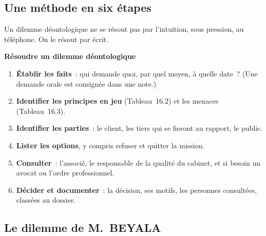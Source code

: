 \subsection{Une méthode en six étapes}

Un dilemme déontologique ne se résout pas par l'intuition, sous pression,
au téléphone. On le résout par écrit.

\begin{boxprocedure}
\textbf{Résoudre un dilemme déontologique}
\begin{enumerate}
    \item \textbf{Établir les faits}~: qui demande quoi, par quel moyen, à
          quelle date~? (Une demande orale est consignée dans une note.)
    \item \textbf{Identifier les principes en jeu} (Tableau~16.2) et les
          menaces (Tableau~16.3).
    \item \textbf{Identifier les parties}~: le client, les tiers qui se
          fieront au rapport, le public.
    \item \textbf{Lister les options}, y compris refuser et quitter la
          mission.
    \item \textbf{Consulter}~: l'associé, le responsable de la qualité du
          cabinet, et si besoin un avocat ou l'ordre professionnel.
    \item \textbf{Décider et documenter}~: la décision, ses motifs, les
          personnes consultées, classées au dossier.
\end{enumerate}
\end{boxprocedure}

\subsection{Le dilemme de M.~BEYALA}

